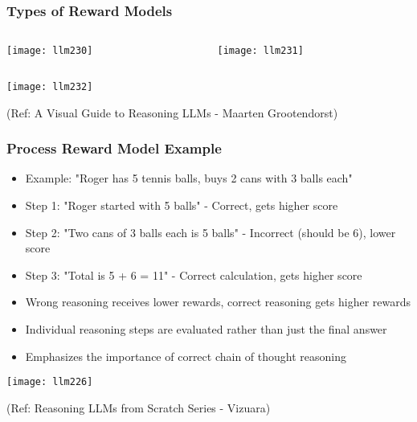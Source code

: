 \begin{frame}[fragile]\frametitle{Types of Reward Models}
  
	  
\begin{columns}
    \begin{column}[T]{0.5\linewidth}
		\begin{center}
        \texttt{[image: llm230]}
		\end{center}

    \end{column}
    \begin{column}[T]{0.5\linewidth}
		\begin{center}
        \texttt{[image: llm231]}
		\end{center}
    \end{column}
  \end{columns}
		
        \texttt{[image: llm232]}
		
		
		{\tiny (Ref: A Visual Guide to Reasoning LLMs - Maarten Grootendorst)}
  
\end{frame}

\begin{frame}[fragile]\frametitle{Process Reward Model Example}
      \begin{itemize}
        \item Example: "Roger has 5 tennis balls, buys 2 cans with 3 balls each"
        \item Step 1: "Roger started with 5 balls" - Correct, gets higher score
        \item Step 2: "Two cans of 3 balls each is 5 balls" - Incorrect (should be 6), lower score
        \item Step 3: "Total is 5 + 6 = 11" - Correct calculation, gets higher score
        \item Wrong reasoning receives lower rewards, correct reasoning gets higher rewards
        \item Individual reasoning steps are evaluated rather than just the final answer
        \item Emphasizes the importance of correct chain of thought reasoning
      \end{itemize}
	  
        \begin{center}
        \texttt{[image: llm226]}
		
		{\tiny (Ref:  Reasoning LLMs from Scratch Series - Vizuara)}
        \end{center}		  
\end{frame}

